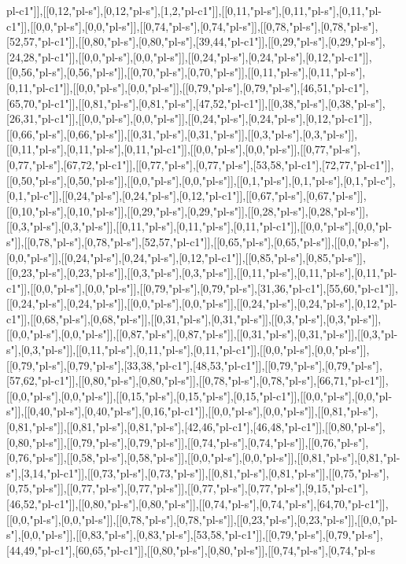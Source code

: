 pl-c1"]],[[0,12,"pl-s"],[0,12,"pl-s"],[1,2,"pl-c1"]],[[0,11,"pl-s"],[0,11,"pl-s"],[0,11,"pl-c1"]],[[0,0,"pl-s"],[0,0,"pl-s"]],[[0,74,"pl-s"],[0,74,"pl-s"]],[[0,78,"pl-s"],[0,78,"pl-s"],[52,57,"pl-c1"]],[[0,80,"pl-s"],[0,80,"pl-s"],[39,44,"pl-c1"]],[[0,29,"pl-s"],[0,29,"pl-s"],[24,28,"pl-c1"]],[[0,0,"pl-s"],[0,0,"pl-s"]],[[0,24,"pl-s"],[0,24,"pl-s"],[0,12,"pl-c1"]],[[0,56,"pl-s"],[0,56,"pl-s"]],[[0,70,"pl-s"],[0,70,"pl-s"]],[[0,11,"pl-s"],[0,11,"pl-s"],[0,11,"pl-c1"]],[[0,0,"pl-s"],[0,0,"pl-s"]],[[0,79,"pl-s"],[0,79,"pl-s"],[46,51,"pl-c1"],[65,70,"pl-c1"]],[[0,81,"pl-s"],[0,81,"pl-s"],[47,52,"pl-c1"]],[[0,38,"pl-s"],[0,38,"pl-s"],[26,31,"pl-c1"]],[[0,0,"pl-s"],[0,0,"pl-s"]],[[0,24,"pl-s"],[0,24,"pl-s"],[0,12,"pl-c1"]],[[0,66,"pl-s"],[0,66,"pl-s"]],[[0,31,"pl-s"],[0,31,"pl-s"]],[[0,3,"pl-s"],[0,3,"pl-s"]],[[0,11,"pl-s"],[0,11,"pl-s"],[0,11,"pl-c1"]],[[0,0,"pl-s"],[0,0,"pl-s"]],[[0,77,"pl-s"],[0,77,"pl-s"],[67,72,"pl-c1"]],[[0,77,"pl-s"],[0,77,"pl-s"],[53,58,"pl-c1"],[72,77,"pl-c1"]],[[0,50,"pl-s"],[0,50,"pl-s"]],[[0,0,"pl-s"],[0,0,"pl-s"]],[[0,1,"pl-s"],[0,1,"pl-s"],[0,1,"pl-c"],[0,1,"pl-c"]],[[0,24,"pl-s"],[0,24,"pl-s"],[0,12,"pl-c1"]],[[0,67,"pl-s"],[0,67,"pl-s"]],[[0,10,"pl-s"],[0,10,"pl-s"]],[[0,29,"pl-s"],[0,29,"pl-s"]],[[0,28,"pl-s"],[0,28,"pl-s"]],[[0,3,"pl-s"],[0,3,"pl-s"]],[[0,11,"pl-s"],[0,11,"pl-s"],[0,11,"pl-c1"]],[[0,0,"pl-s"],[0,0,"pl-s"]],[[0,78,"pl-s"],[0,78,"pl-s"],[52,57,"pl-c1"]],[[0,65,"pl-s"],[0,65,"pl-s"]],[[0,0,"pl-s"],[0,0,"pl-s"]],[[0,24,"pl-s"],[0,24,"pl-s"],[0,12,"pl-c1"]],[[0,85,"pl-s"],[0,85,"pl-s"]],[[0,23,"pl-s"],[0,23,"pl-s"]],[[0,3,"pl-s"],[0,3,"pl-s"]],[[0,11,"pl-s"],[0,11,"pl-s"],[0,11,"pl-c1"]],[[0,0,"pl-s"],[0,0,"pl-s"]],[[0,79,"pl-s"],[0,79,"pl-s"],[31,36,"pl-c1"],[55,60,"pl-c1"]],[[0,24,"pl-s"],[0,24,"pl-s"]],[[0,0,"pl-s"],[0,0,"pl-s"]],[[0,24,"pl-s"],[0,24,"pl-s"],[0,12,"pl-c1"]],[[0,68,"pl-s"],[0,68,"pl-s"]],[[0,31,"pl-s"],[0,31,"pl-s"]],[[0,3,"pl-s"],[0,3,"pl-s"]],[[0,0,"pl-s"],[0,0,"pl-s"]],[[0,87,"pl-s"],[0,87,"pl-s"]],[[0,31,"pl-s"],[0,31,"pl-s"]],[[0,3,"pl-s"],[0,3,"pl-s"]],[[0,11,"pl-s"],[0,11,"pl-s"],[0,11,"pl-c1"]],[[0,0,"pl-s"],[0,0,"pl-s"]],[[0,79,"pl-s"],[0,79,"pl-s"],[33,38,"pl-c1"],[48,53,"pl-c1"]],[[0,79,"pl-s"],[0,79,"pl-s"],[57,62,"pl-c1"]],[[0,80,"pl-s"],[0,80,"pl-s"]],[[0,78,"pl-s"],[0,78,"pl-s"],[66,71,"pl-c1"]],[[0,0,"pl-s"],[0,0,"pl-s"]],[[0,15,"pl-s"],[0,15,"pl-s"],[0,15,"pl-c1"]],[[0,0,"pl-s"],[0,0,"pl-s"]],[[0,40,"pl-s"],[0,40,"pl-s"],[0,16,"pl-c1"]],[[0,0,"pl-s"],[0,0,"pl-s"]],[[0,81,"pl-s"],[0,81,"pl-s"]],[[0,81,"pl-s"],[0,81,"pl-s"],[42,46,"pl-c1"],[46,48,"pl-c1"]],[[0,80,"pl-s"],[0,80,"pl-s"]],[[0,79,"pl-s"],[0,79,"pl-s"]],[[0,74,"pl-s"],[0,74,"pl-s"]],[[0,76,"pl-s"],[0,76,"pl-s"]],[[0,58,"pl-s"],[0,58,"pl-s"]],[[0,0,"pl-s"],[0,0,"pl-s"]],[[0,81,"pl-s"],[0,81,"pl-s"],[3,14,"pl-c1"]],[[0,73,"pl-s"],[0,73,"pl-s"]],[[0,81,"pl-s"],[0,81,"pl-s"]],[[0,75,"pl-s"],[0,75,"pl-s"]],[[0,77,"pl-s"],[0,77,"pl-s"]],[[0,77,"pl-s"],[0,77,"pl-s"],[9,15,"pl-c1"],[46,52,"pl-c1"]],[[0,80,"pl-s"],[0,80,"pl-s"]],[[0,74,"pl-s"],[0,74,"pl-s"],[64,70,"pl-c1"]],[[0,0,"pl-s"],[0,0,"pl-s"]],[[0,78,"pl-s"],[0,78,"pl-s"]],[[0,23,"pl-s"],[0,23,"pl-s"]],[[0,0,"pl-s"],[0,0,"pl-s"]],[[0,83,"pl-s"],[0,83,"pl-s"],[53,58,"pl-c1"]],[[0,79,"pl-s"],[0,79,"pl-s"],[44,49,"pl-c1"],[60,65,"pl-c1"]],[[0,80,"pl-s"],[0,80,"pl-s"]],[[0,74,"pl-s"],[0,74,"pl-s